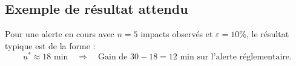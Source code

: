 \documentclass[a4paper,11pt]{article}
\begin{document}
\subsection{Exemple de résultat attendu}

Pour une alerte en cours avec $n = 5$ impacts observés et $\varepsilon = 10\%$, le résultat typique est de la forme :
\[
u^* \approx 18 \text{ min} \quad \Longrightarrow \quad \text{Gain de } 30 - 18 = 12 \text{ min sur l'alerte réglementaire.}
\]



\end{document}
